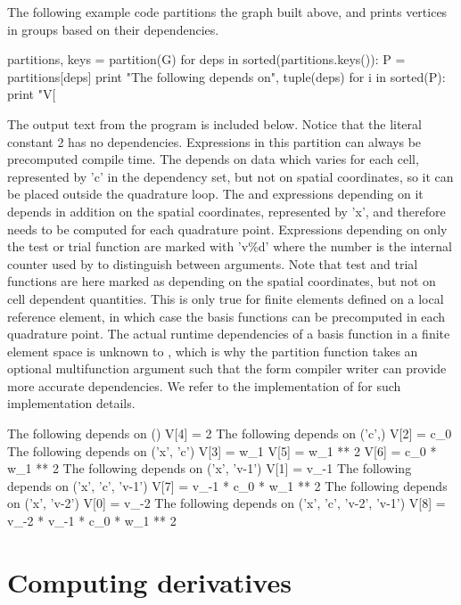 The following example code partitions the graph built above,
and prints vertices in groups based on their dependencies.
\begin{python}
partitions, keys = partition(G)
for deps in sorted(partitions.keys()):
    P = partitions[deps]
    print "The following depends on", tuple(deps)
    for i in sorted(P):
        print "V[%
\end{python}
The output text from the program is included below.
Notice that the literal constant 2 has no dependencies. Expressions in
this partition can always be precomputed compile time. The
  depends on data which varies for each
cell, represented by 'c' in the dependency set, but not on spatial
coordinates, so it can be placed outside the quadrature loop. The
  and expressions depending on it depends
in addition on the spatial coordinates, represented by 'x', and
therefore needs to be computed for each quadrature point.  Expressions
depending on only the test or trial function are marked with 'v\%d'
where the number is the internal counter used by \ufl{} to distinguish
between arguments.  Note that test and trial functions are here marked
as depending on the spatial coordinates, but not on cell dependent
quantities. This is only true for finite elements defined on a local
reference element, in which case the basis functions can be
precomputed in each quadrature point.  The actual runtime dependencies
of a basis function in a finite element space is unknown to \ufl{},
which is why the partition function takes an optional multifunction
argument such that the form compiler writer can provide more accurate
dependencies. We refer to the implementation of  for
such implementation details.
\begin{gencode}
The following depends on ()
V[4] = 2
The following depends on ('c',)
V[2] = c_0
The following depends on ('x', 'c')
V[3] = w_1
V[5] = w_1 ** 2
V[6] = c_0 * w_1 ** 2
The following depends on ('x', 'v-1')
V[1] = v_{-1}
The following depends on ('x', 'c', 'v-1')
V[7] = v_{-1} * c_0 * w_1 ** 2
The following depends on ('x', 'v-2')
V[0] = v_{-2}
The following depends on ('x', 'c', 'v-2', 'v-1')
V[8] = v_{-2} * v_{-1} * c_0 * w_1 ** 2
\end{gencode}

\section{Computing derivatives} \label{ufl:sec:ad}

